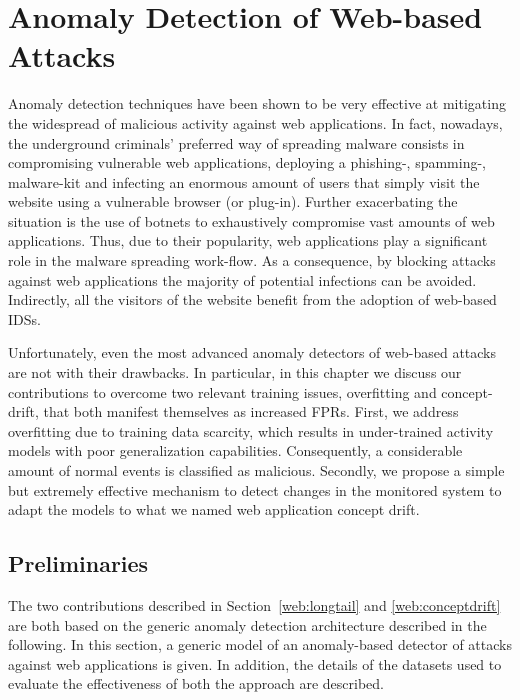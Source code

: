 \chapter{Anomaly Detection of Web-based Attacks}
\label{web}
Anomaly detection techniques have been shown to be very effective at mitigating the widespread of malicious activity against web applications. In fact, nowadays, the underground criminals' preferred way of spreading malware consists in compromising vulnerable web applications, deploying a phishing-, spamming-, malware-kit and infecting an enormous amount of users that simply visit the website using a vulnerable browser (or plug-in). Further exacerbating the situation is the use of botnets to exhaustively compromise vast amounts of web applications. Thus, due to their popularity, web applications play a significant role in the malware spreading work-flow. As a consequence, by blocking attacks against web applications the majority of potential infections can be avoided. Indirectly, all the visitors of the website benefit from the adoption of web-based \acp{IDS}.

Unfortunately, even the most advanced anomaly detectors of web-based attacks are not with their drawbacks. In particular, in this chapter we discuss our contributions to overcome two relevant training issues, overfitting and concept-drift, that both manifest themselves as increased \acp{FPR}. First, we address overfitting due to training data scarcity, which results in under-trained activity models with poor generalization capabilities. Consequently, a considerable amount of normal events is classified as malicious. Secondly, we propose a simple but extremely effective mechanism to detect changes in the monitored system to adapt the models to what we named web application concept drift.

\section{Preliminaries}
\label{web:intro}
The two contributions described in Section~\ref{web:longtail} and \ref{web:conceptdrift} are both based on the generic anomaly detection architecture described in the following. In this section, a generic model of an anomaly-based detector of attacks against web applications is given. In addition, the details of the datasets used to evaluate the effectiveness of both the approach are described.

